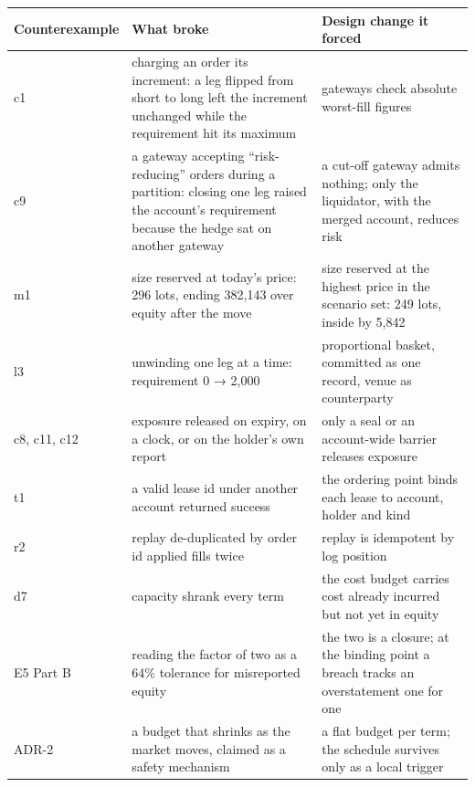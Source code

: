 \documentclass[10pt,a4paper]{article}
\newcounter{none}  %
\begin{document}
{\def\LTcaptype{none} %
\begin{longtable}[]{@{}
  >{\raggedright\arraybackslash}p{}
  >{\raggedright\arraybackslash}p{}
  >{\raggedright\arraybackslash}p{}@{}}
\toprule\noalign{}
\begin{minipage}[b]{\linewidth}\raggedright
Counterexample
\end{minipage} & \begin{minipage}[b]{\linewidth}\raggedright
What broke
\end{minipage} & \begin{minipage}[b]{\linewidth}\raggedright
Design change it forced
\end{minipage} \\
\midrule\noalign{}
\endhead
\bottomrule\noalign{}
\endlastfoot
c1 & charging an order its increment: a leg flipped from short to long left the increment unchanged while the requirement hit its maximum & gateways check absolute worst-fill figures \\
c9 & a gateway accepting ``risk-reducing'' orders during a partition: closing one leg raised the account's requirement because the hedge sat on another gateway & a cut-off gateway admits nothing; only the liquidator, with the merged account, reduces risk \\
m1 & size reserved at today's price: 296 lots, ending 382,143 over equity after the move & size reserved at the highest price in the scenario set: 249 lots, inside by 5,842 \\
l3 & unwinding one leg at a time: requirement 0 → 2,000 & proportional basket, committed as one record, venue as counterparty \\
c8, c11, c12 & exposure released on expiry, on a clock, or on the holder's own report & only a seal or an account-wide barrier releases exposure \\
t1 & a valid lease id under another account returned success & the ordering point binds each lease to account, holder and kind \\
r2 & replay de-duplicated by order id applied fills twice & replay is idempotent by log position \\
d7 & capacity shrank every term & the cost budget carries cost already incurred but not yet in equity \\
E5 Part B & reading the factor of two as a 64\% tolerance for misreported equity & the two is a closure; at the binding point a breach tracks an overstatement one for one \\
ADR-2 & a budget that shrinks as the market moves, claimed as a safety mechanism & a flat budget per term; the schedule survives only as a local trigger \\
\end{longtable}
}
\end{document}
